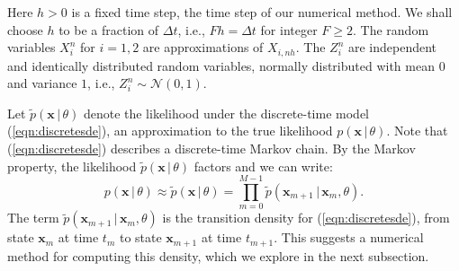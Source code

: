 \documentclass[graybox]{svmult}
\begin{document}
Here $h > 0$ is a fixed time step, the time step of our numerical method.  We shall choose $h$ to be a fraction of $\Delta t$, i.e., $F h = \Delta t$ for integer $F \geq 2$.  The random variables $X_i^n$ for $i=1,2$ are approximations of $X_{i,n h}$.  The $Z_i^n$ are independent and identically distributed random variables, normally distributed with mean $0$ and variance $1$, i.e., $Z_i^n \sim \mathcal{N}(0,1)$.

Let $\widetilde{p}(\mathbf{x} \, | \, \theta)$ denote the likelihood under the discrete-time model (\ref{eqn:discretesde}), an approximation to the true likelihood $p(\mathbf{x} \, | \, \theta)$.  Note that (\ref{eqn:discretesde}) describes a discrete-time Markov chain.  By the Markov property, the likelihood $\widetilde{p}(\mathbf{x} \, | \, \theta)$ factors and we can write:
\begin{equation}
\label{eqn:markovfactor}
p(\mathbf{x} \, | \, \theta) \approx \widetilde{p}(\mathbf{x} \, | \, \theta) = \prod_{m=0}^{M-1} \widetilde{p}(\mathbf{x}_{m+1} \, | \, \mathbf{x}_m, \theta).
\end{equation}
The term $\widetilde{p}(\mathbf{x}_{m+1} \, | \, \mathbf{x}_m, \theta)$ is the transition density for (\ref{eqn:discretesde}), from state $\mathbf{x}_m$ at time $t_m$ to state $\mathbf{x}_{m+1}$ at time $t_{m+1}$.  This suggests a numerical method for computing this density, which we explore in the next subsection.
 
\end{document}
